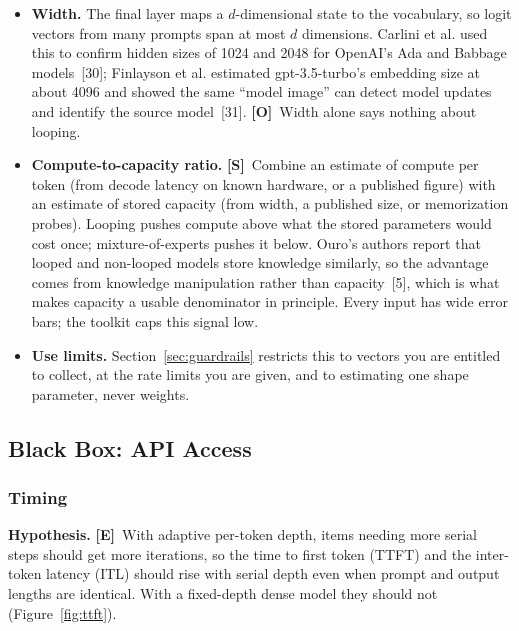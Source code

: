 \documentclass[11pt,letterpaper]{article}
\newcommand{\mO}{\textcolor{sensorteal}{\textbf{[O]}}}
\newcommand{\mE}{\textcolor{deepindigo}{\textbf{[E]}}}
\newcommand{\mS}{\textcolor{darkamber}{\textbf{[S]}}}
\begin{document}
\begin{itemize}
  \item \textbf{Width.} The final layer maps a $d$-dimensional state to the vocabulary, so logit vectors from many prompts span at most $d$ dimensions. Carlini et al. used this to confirm hidden sizes of 1024 and 2048 for OpenAI's Ada and Babbage models~[30]; Finlayson et al. estimated gpt-3.5-turbo's embedding size at about 4096 and showed the same ``model image'' can detect model updates and identify the source model~[31]. \mO\ Width alone says nothing about looping.
  \item \textbf{Compute-to-capacity ratio.} \mS\ Combine an estimate of compute per token (from decode latency on known hardware, or a published figure) with an estimate of stored capacity (from width, a published size, or memorization probes). Looping pushes compute above what the stored parameters would cost once; mixture-of-experts pushes it below. Ouro's authors report that looped and non-looped models store knowledge similarly, so the advantage comes from knowledge manipulation rather than capacity~[5], which is what makes capacity a usable denominator in principle. Every input has wide error bars; the toolkit caps this signal low.
  \item \textbf{Use limits.} Section~\ref{sec:guardrails} restricts this to vectors you are entitled to collect, at the rate limits you are given, and to estimating one shape parameter, never weights.
\end{itemize}

\subsection{Black Box: API Access}
\label{sec:blackbox}

\subsubsection{Timing}
\label{sec:timing}

\textbf{Hypothesis.} \mE\ With adaptive per-token depth, items needing more serial steps should get more iterations, so the time to first token (TTFT) and the inter-token latency (ITL) should rise with serial depth even when prompt and output lengths are identical. With a fixed-depth dense model they should not (Figure~\ref{fig:ttft}).
\end{document}
